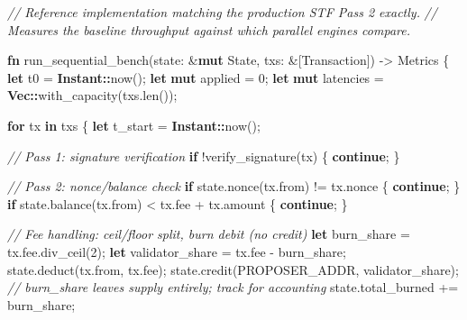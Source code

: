 \documentclass[11pt,a4paper]{article}
\providecommand{\NormalTok}[1]{#1}
\providecommand{\KeywordTok}[1]{\textbf{#1}}
\providecommand{\DataTypeTok}[1]{\textbf{#1}}
\providecommand{\CommentTok}[1]{\textit{#1}}
\providecommand{\OperatorTok}[1]{#1}
\providecommand{\ControlFlowTok}[1]{\textbf{#1}}
\providecommand{\DecValTok}[1]{#1}
\providecommand{\PreprocessorTok}[1]{\textbf{#1}}
\newenvironment{Shaded}{}{}
\newenvironment{Highlighting}[1][]{\par\noindent\begin{minipage}{\linewidth}\ttfamily\small}{\end{minipage}\par}
\begin{document}
\begin{Shaded}
\begin{Highlighting}[]
\CommentTok{// Reference implementation matching the production STF Pass 2 exactly.}
\CommentTok{// Measures the baseline throughput against which parallel engines compare.}

\KeywordTok{fn}\NormalTok{ run\_sequential\_bench(state}\OperatorTok{:} \OperatorTok{\&}\KeywordTok{mut}\NormalTok{ State}\OperatorTok{,}\NormalTok{ txs}\OperatorTok{:} \OperatorTok{\&}\NormalTok{[Transaction]) }\OperatorTok{{-}\textgreater{}}\NormalTok{ Metrics }\OperatorTok{\{}
    \KeywordTok{let}\NormalTok{ t0 }\OperatorTok{=} \PreprocessorTok{Instant::}\NormalTok{now()}\OperatorTok{;}
    \KeywordTok{let} \KeywordTok{mut}\NormalTok{ applied }\OperatorTok{=} \DecValTok{0}\OperatorTok{;}
    \KeywordTok{let} \KeywordTok{mut}\NormalTok{ latencies }\OperatorTok{=} \DataTypeTok{Vec}\PreprocessorTok{::}\NormalTok{with\_capacity(txs}\OperatorTok{.}\NormalTok{len())}\OperatorTok{;}

    \ControlFlowTok{for}\NormalTok{ tx }\KeywordTok{in}\NormalTok{ txs }\OperatorTok{\{}
        \KeywordTok{let}\NormalTok{ t\_start }\OperatorTok{=} \PreprocessorTok{Instant::}\NormalTok{now()}\OperatorTok{;}

        \CommentTok{// Pass 1: signature verification}
        \ControlFlowTok{if} \OperatorTok{!}\NormalTok{verify\_signature(tx) }\OperatorTok{\{} \ControlFlowTok{continue}\OperatorTok{;} \OperatorTok{\}}

        \CommentTok{// Pass 2: nonce/balance check}
        \ControlFlowTok{if}\NormalTok{ state}\OperatorTok{.}\NormalTok{nonce(tx}\OperatorTok{.}\NormalTok{from) }\OperatorTok{!=}\NormalTok{ tx}\OperatorTok{.}\NormalTok{nonce }\OperatorTok{\{} \ControlFlowTok{continue}\OperatorTok{;} \OperatorTok{\}}
        \ControlFlowTok{if}\NormalTok{ state}\OperatorTok{.}\NormalTok{balance(tx}\OperatorTok{.}\NormalTok{from) }\OperatorTok{\textless{}}\NormalTok{ tx}\OperatorTok{.}\NormalTok{fee }\OperatorTok{+}\NormalTok{ tx}\OperatorTok{.}\NormalTok{amount }\OperatorTok{\{} \ControlFlowTok{continue}\OperatorTok{;} \OperatorTok{\}}

        \CommentTok{// Fee handling: ceil/floor split, burn debit (no credit)}
        \KeywordTok{let}\NormalTok{ burn\_share }\OperatorTok{=}\NormalTok{ tx}\OperatorTok{.}\NormalTok{fee}\OperatorTok{.}\NormalTok{div\_ceil(}\DecValTok{2}\NormalTok{)}\OperatorTok{;}
        \KeywordTok{let}\NormalTok{ validator\_share }\OperatorTok{=}\NormalTok{ tx}\OperatorTok{.}\NormalTok{fee }\OperatorTok{{-}}\NormalTok{ burn\_share}\OperatorTok{;}
\NormalTok{        state}\OperatorTok{.}\NormalTok{deduct(tx}\OperatorTok{.}\NormalTok{from}\OperatorTok{,}\NormalTok{ tx}\OperatorTok{.}\NormalTok{fee)}\OperatorTok{;}
\NormalTok{        state}\OperatorTok{.}\NormalTok{credit(PROPOSER\_ADDR}\OperatorTok{,}\NormalTok{ validator\_share)}\OperatorTok{;}
        \CommentTok{// burn\_share leaves supply entirely; track for accounting}
\NormalTok{        state}\OperatorTok{.}\NormalTok{total\_burned }\OperatorTok{+=}\NormalTok{ burn\_share}\OperatorTok{;}


\end{Highlighting}
\end{Shaded}
\end{document}
